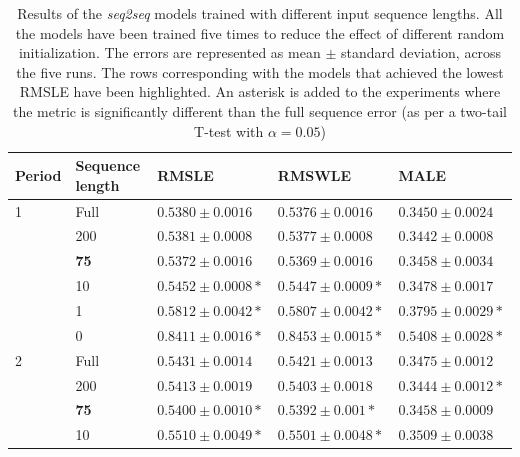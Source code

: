 	\begin{table}[h]
	\footnotesize
	\caption[Results for the sequence length ablation study]{Results of the \textit{seq2seq} models trained with different input sequence lengths. All the models have been trained five times to reduce the effect of different random initialization. The errors are represented as mean $\pm$ standard deviation, across the five runs. The rows corresponding with the models that achieved the lowest RMSLE have been highlighted. An asterisk is added to the experiments where the metric is significantly different than the full sequence error (as per a two-tail T-test with $\alpha=0.05$)}
	\label{tab:salesforecast_results_ablation_length}
	\centering
	\begin{tabular}{lllll}
		\hline
		Period & Sequence length & RMSLE                           & RMSWLE                         & MALE                           \\ \hline
		1      & Full            & $ 0.5380 \pm 0.0016 $           & $ 0.5376 \pm 0.0016 $          & $  0.3450 \pm 0.0024$          \\
      & 200             & $ 0.5381 \pm 0.0008 $           & $ 0.5377 \pm 0.0008 $          & $ 0.3442 \pm 0.0008 $          \\
      & \textbf{75}     & $ \mathbf{0.5372 \pm 0.0016} $  & $ \mathbf{0.5369 \pm 0.0016} $ & $ \mathbf{0.3458 \pm 0.0034} $ \\
      & 10              & $ 0.5452 \pm 0.0008 *$          & $ 0.5447 \pm 0.0009 *$         & $ 0.3478 \pm 0.0017 $          \\
      & 1               & $ 0.5812 \pm 0.0042 *$          & $ 0.5807 \pm 0.0042 *$         & $ 0.3795 \pm 0.0029 *$          \\
      & 0               & $ 0.8411 \pm 0.0016 *$          & $ 0.8453 \pm 0.0015 *$         & $ 0.5408 \pm 0.0028 *$          \\ \hline
		2      & Full            & $ 0.5431 \pm 0.0014 $           & $ 0.5421 \pm 0.0013 $          & $ 0.3475 \pm 0.0012 $          \\
      & 200             & $ 0.5413 \pm 0.0019 $           & $ 0.5403 \pm 0.0018 $          & $ 0.3444 \pm 0.0012 *$          \\
      & \textbf{75}     & $ \mathbf{0.5400 \pm 0.0010}* $ & $ \mathbf{0.5392 \pm 0.001}* $ & $ \mathbf{0.3458 \pm 0.0009} $ \\
      & 10              & $ 0.5510 \pm 0.0049 *$          & $ 0.5501 \pm 0.0048 *$         & $ 0.3509 \pm 0.0038 $          \\

\end{tabular}
\end{table}
